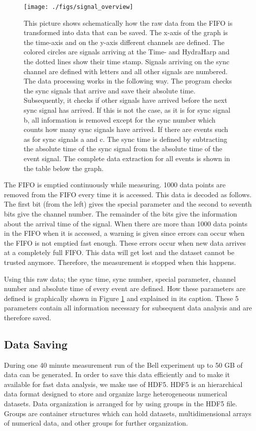 \begin{figure}[ht]\centering
\texttt{[image: ./figs/signal\_overview]}
\caption{This picture shows schematically how the raw data from the FIFO is transformed into data that can be saved. The x-axis of the graph is the time-axis and on the y-axis different channels are defined. The colored circles are signals arriving at the Time- and HydraHarp and the dotted lines show their time stamp. Signals arriving on the sync channel are defined with letters and all other signals are numbered. The data processing works in the following way. The program checks the sync signals that arrive and save their absolute time. Subsequently, it checks if other signals have arrived before the next sync signal has arrived. If this is not the case, as it is for sync signal b, all information is removed except for the sync number which counts how many sync signals have arrived. If there are events such as for sync signals a and c. The sync time is defined by subtracting the absolute time of the sync signal from the absolute time of the event signal. The complete data extraction for all events is shown in the table below the graph.}
\label{fig:signal_overview}
\end{figure}
The FIFO is emptied continuously while measuring. 1000 data points are removed from the FIFO every time it is accessed. This data is decoded as follows. The first bit (from the left) gives the special  parameter and the second to seventh bits give the channel number. The remainder of the bits give the information about the arrival time of the signal. When there are more than 1000 data points in the FIFO when it is accessed, a warning is given since errors can occur when the FIFO is not emptied fast enough. These errors occur when new data arrives at a completely full FIFO. This data will get lost and the dataset cannot be trusted anymore. Therefore, the measurement is stopped when this happens. 

Using this raw data; the sync time, sync number, special parameter, channel number and absolute time of every event are defined. How these parameters are defined is graphically shown in Figure \ref{fig:signal_overview} and explained in its caption. These 5 parameters contain all information necessary for subsequent data analysis and are therefore saved. 

\color{tudelft-cyan}
\subsection{Data Saving}
\label{data_saving}
\color{black}
During one 40 minute measurement run of the Bell experiment up to 50 GB of data can be generated. In order to save this data efficiently and to make it available for fast data analysis, we make use of HDF5. HDF5 is an hierarchical data format designed to store and organize large heterogeneous numerical datasets.  Data organization is arranged for by using groups in the HDF5 file. Groups are container structures which can hold datasets, multidimensional arrays of numerical data, and other groups for further organization. 

